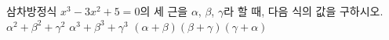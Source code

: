 삼차방정식 $x^3-3x^2+5=0$의 세 근을 $\alpha$, $\beta$, $\gamma$라 할 때, 다음 식의 값을 구하시오.
 $\alpha^2+\beta^2+\gamma^2$
 $\alpha^3+\beta^3+\gamma^3$
 $(\alpha+\beta)(\beta+\gamma)(\gamma+\alpha)$
